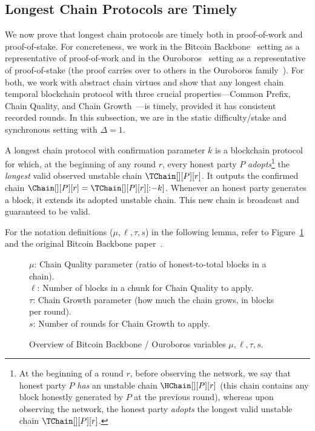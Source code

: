 \subsection{Longest Chain Protocols are Timely}

We now prove that longest chain protocols are timely both in proof-of-work and proof-of-stake.
For concreteness, we work in the Bitcoin Backbone~\cite{backbone} setting
as a representative of proof-of-work and in the Ouroboros~\cite{ouroboros} setting
as a representative of proof-of-stake (the proof carries over to others in the Ouroboros family~\cite{praos,ouroboros-genesis}).
For both, we work with abstract chain virtues
and show that any longest chain
temporal blockchain protocol with three crucial properties---Common Prefix,
Chain Quality, and Chain Growth~\cite{backbone}---is timely,
provided it has consistent recorded rounds.
In this subsection, we are in the
static difficulty/stake and synchronous setting with $\Delta = 1$.

\begin{definition}
  A longest chain protocol with confirmation parameter $k$
  is a blockchain protocol for which,
  at the beginning of any round $r$, every honest party $P$ \emph{adopts}\footnote{
    At the beginning of a round $r$, before observing the network, we say that
    honest party $P$ \emph{has} an unstable chain $\HChain[][P][r]$ (this chain
    contains any block honestly generated by $P$ at the previous round), whereas
    upon observing the network, the honest party \emph{adopts} the longest
    valid unstable chain $\TChain[][P][r]$.
  }
  the \emph{longest} valid observed unstable chain $\TChain[][P][r]$. It outputs the
  confirmed chain $\Chain[][P][r] = \TChain[][P][r][{:}{-k}]$.
  Whenever an honest party generates a block, it extends
  its adopted unstable chain. This new chain is broadcast and
  guaranteed to be valid.
\end{definition}

For the notation definitions ($\mu, \ell, \tau, s$)
in the following lemma, refer to Figure~\ref{fig.backbone-variables}
and the original Bitcoin Backbone paper~\cite{backbone-new}.

\begin{figure}
  \begin{mdframed}
    $\mu$: Chain Quality parameter (ratio of honest-to-total blocks in a chain).\\
    $\ell$: Number of blocks in a chunk for Chain Quality to apply.\\
    $\tau$: Chain Growth parameter (how much the chain grows, in blocks per round).\\
    $s$: Number of rounds for Chain Growth to apply.
  \end{mdframed}
  \caption{Overview of Bitcoin Backbone / Ouroboros variables $\mu, \ell, \tau, s$.}
  \label{fig.backbone-variables}
\end{figure}

